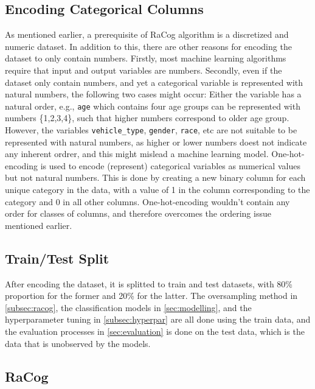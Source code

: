 \documentclass{article}
\begin{document}
\hypertarget{encoding-categorical-columns}{%
\subsection{\texorpdfstring{Encoding Categorical Columns
\label{subsec:encode}}{Encoding Categorical Columns }}\label{encoding-categorical-columns}}

As mentioned earlier, a prerequisite of RaCog algorithm is a discretized
and numeric dataset. In addition to this, there are other reasons for
encoding the dataset to only contain numbers. Firstly, most machine
learning algorithms require that input and output variables are numbers.
Secondly, even if the dataset only contain numbers, and yet a
categorical variable is represented with natural numbers, the following
two cases might occur: Either the variable has a natural order, e.g.,
\texttt{age} which contains four age groups can be represented with
numbers \{1,2,3,4\}, such that higher numbers correspond to older age
group. However, the variables \texttt{vehicle\_type}, \texttt{gender},
\texttt{race}, etc are not suitable to be represented with natural
numbers, as higher or lower numbers doest not indicate any inherent
ordrer, and this might mislead a machine learning model.
One-hot-encoding is used to encode (represent) categorical variables as
numerical values but not natural numbers. This is done by creating a new
binary column for each unique category in the data, with a value of 1 in
the column corresponding to the category and 0 in all other columns.
One-hot-encoding wouldn't contain any order for classes of columns, and
therefore overcomes the ordering issue mentioned earlier.

\hypertarget{traintest-split}{%
\subsection{\texorpdfstring{Train/Test Split
\label{subsec:split}}{Train/Test Split }}\label{traintest-split}}

After encoding the dataset, it is splitted to train and test datasets,
with 80\% proportion for the former and 20\% for the latter. The
oversampling method in \ref{subsec:racog}, the classification models in
\ref{sec:modelling}, and the hyperparameter tuning in
\ref{subsec:hyperpar} are all done using the train data, and the
evaluation processes in \ref{sec:evaluation} is done on the test data,
which is the data that is unobserved by the models.

\hypertarget{racog}{%
\subsection{\texorpdfstring{RaCog
\label{subsec:racog}}{RaCog }}\label{racog}}
\end{document}
